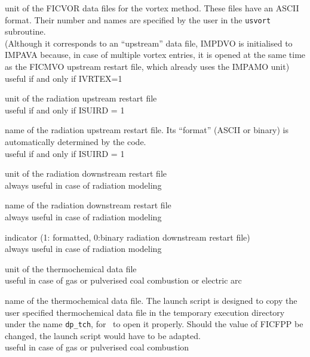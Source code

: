 {unit of the FICVOR data files for the vortex method. These files have an ASCII
format. Their number and names are specified by the user in the \texttt{usvort} subroutine.\\
(Although it corresponds to an ``upstream'' data file, IMPDVO is initialised to
IMPAVA because, in case of multiple vortex entries, it is opened at the same time
as the FICMVO upstream restart file, which already uses the IMPAMO unit)\\
useful if and only if IVRTEX=1}



{unit of the radiation upstream restart file\\
useful if and only if ISUIRD = 1}

{name of the radiation upstream restart file. Its ``format'' (ASCII or
binary) is automatically determined by the code.\\
useful if and only if ISUIRD = 1}

{unit of the radiation downstream restart file\\
always useful in case of radiation modeling}

{name of the radiation downstream restart file \\
always useful in case of radiation modeling}

{indicator (1: formatted, 0:binary radiation downstream restart file)\\
always useful in case of radiation modeling}




{unit of the thermochemical data file\\
useful in case of gas or pulverised coal combustion or electric arc}

{name of the thermochemical data file. The launch script is designed to copy the
user specified thermochemical data file in the temporary execution directory
under the name \texttt{dp\_tch}, for \CS\ to open it properly. Should the value
of FICFPP be changed, the launch script would have to be adapted.\\
useful in case of gas or pulverised coal combustion}

